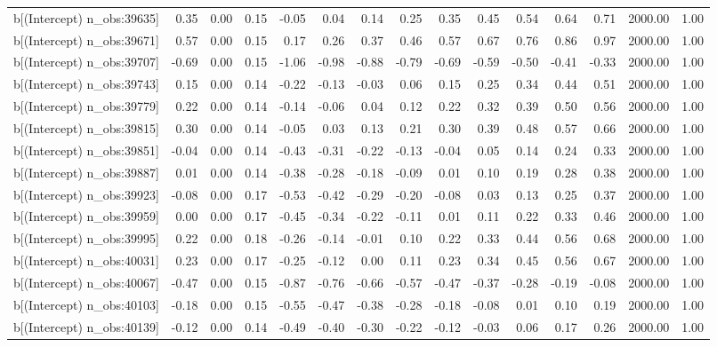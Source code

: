 \begin{table}[ht]
\begin{tabular}{rrrrrrrrrrrrrrr}
  b[(Intercept) n\_obs:39635] & 0.35 & 0.00 & 0.15 & -0.05 & 0.04 & 0.14 & 0.25 & 0.35 & 0.45 & 0.54 & 0.64 & 0.71 & 2000.00 & 1.00 \\ 
  b[(Intercept) n\_obs:39671] & 0.57 & 0.00 & 0.15 & 0.17 & 0.26 & 0.37 & 0.46 & 0.57 & 0.67 & 0.76 & 0.86 & 0.97 & 2000.00 & 1.00 \\ 
  b[(Intercept) n\_obs:39707] & -0.69 & 0.00 & 0.15 & -1.06 & -0.98 & -0.88 & -0.79 & -0.69 & -0.59 & -0.50 & -0.41 & -0.33 & 2000.00 & 1.00 \\ 
  b[(Intercept) n\_obs:39743] & 0.15 & 0.00 & 0.14 & -0.22 & -0.13 & -0.03 & 0.06 & 0.15 & 0.25 & 0.34 & 0.44 & 0.51 & 2000.00 & 1.00 \\ 
  b[(Intercept) n\_obs:39779] & 0.22 & 0.00 & 0.14 & -0.14 & -0.06 & 0.04 & 0.12 & 0.22 & 0.32 & 0.39 & 0.50 & 0.56 & 2000.00 & 1.00 \\ 
  b[(Intercept) n\_obs:39815] & 0.30 & 0.00 & 0.14 & -0.05 & 0.03 & 0.13 & 0.21 & 0.30 & 0.39 & 0.48 & 0.57 & 0.66 & 2000.00 & 1.00 \\ 
  b[(Intercept) n\_obs:39851] & -0.04 & 0.00 & 0.14 & -0.43 & -0.31 & -0.22 & -0.13 & -0.04 & 0.05 & 0.14 & 0.24 & 0.33 & 2000.00 & 1.00 \\ 
  b[(Intercept) n\_obs:39887] & 0.01 & 0.00 & 0.14 & -0.38 & -0.28 & -0.18 & -0.09 & 0.01 & 0.10 & 0.19 & 0.28 & 0.38 & 2000.00 & 1.00 \\ 
  b[(Intercept) n\_obs:39923] & -0.08 & 0.00 & 0.17 & -0.53 & -0.42 & -0.29 & -0.20 & -0.08 & 0.03 & 0.13 & 0.25 & 0.37 & 2000.00 & 1.00 \\ 
  b[(Intercept) n\_obs:39959] & 0.00 & 0.00 & 0.17 & -0.45 & -0.34 & -0.22 & -0.11 & 0.01 & 0.11 & 0.22 & 0.33 & 0.46 & 2000.00 & 1.00 \\ 
  b[(Intercept) n\_obs:39995] & 0.22 & 0.00 & 0.18 & -0.26 & -0.14 & -0.01 & 0.10 & 0.22 & 0.33 & 0.44 & 0.56 & 0.68 & 2000.00 & 1.00 \\ 
  b[(Intercept) n\_obs:40031] & 0.23 & 0.00 & 0.17 & -0.25 & -0.12 & 0.00 & 0.11 & 0.23 & 0.34 & 0.45 & 0.56 & 0.67 & 2000.00 & 1.00 \\ 
  b[(Intercept) n\_obs:40067] & -0.47 & 0.00 & 0.15 & -0.87 & -0.76 & -0.66 & -0.57 & -0.47 & -0.37 & -0.28 & -0.19 & -0.08 & 2000.00 & 1.00 \\ 
  b[(Intercept) n\_obs:40103] & -0.18 & 0.00 & 0.15 & -0.55 & -0.47 & -0.38 & -0.28 & -0.18 & -0.08 & 0.01 & 0.10 & 0.19 & 2000.00 & 1.00 \\ 
  b[(Intercept) n\_obs:40139] & -0.12 & 0.00 & 0.14 & -0.49 & -0.40 & -0.30 & -0.22 & -0.12 & -0.03 & 0.06 & 0.17 & 0.26 & 2000.00 & 1.00 \\ 

\end{tabular}
\end{table}
